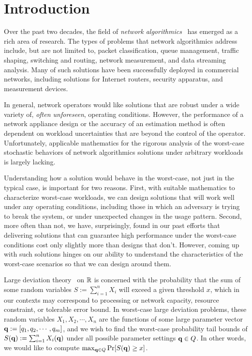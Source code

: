 \section{Introduction}

Over the past two decades, the field of \emph{network algorithmics}~\cite{Varghese04Algorithmics}
has emerged as a rich area of research. The types of problems that network
algorithmics address include, but are not limited to, packet classification,
queue management, traffic shaping, switching and routing, network measurement,
and data streaming analysis. Many of such solutions have been successfully
deployed in commercial networks, including solutions for Internet routers,
security apparatus, and measurement devices. 

In general, network operators
would like solutions that are robust under a wide variety of, \emph{often
unforeseen}, operating conditions. However, the performance of a network appliance
design or the accuracy of an estimation method is often dependent on workload
uncertainties that are beyond the control of the operator. Unfortunately,
applicable mathematics for the rigorous analysis of the worst-case stochastic behaviors of
network algorithmics solutions under arbitrary workloads is largely lacking.

Understanding how a solution would behave in the worst-case, not just in
the typical case, is important for two reasons. First, with suitable mathematics
to characterize worst-case workloads, we can design solutions that will work
well under any operating conditions, including those in which an adversary is
trying to break the system, or under unexpected changes in the usage pattern.
Second, more often than not, we have, surprisingly, found in our past efforts
that delivering solutions that can guarantee high performance under the worst-case
conditions cost only slightly more than designs that don't. However, coming up
with such solutions hinges on our ability to understand the characteristics
of the worst-case scenarios so that we can design around them.

Large deviation theory~\cite{Dembo98LDV} on $\mathbb R$ is concerned with the probability that
the sum of some random variables $S := \sum_{i=1}^n X_i$ will exceed a given
threshold $x$, which in our contexts may correspond to processing or network capacity,
resource constraint, or tolerable error bound. In worst-case large deviation problems, 
these random variables $X_1, X_2, \cdots, X_n$
are the functions of some large parameter vector $\mathbf{q} := \lbrack q_1, q_2, \cdots, q_m\rbrack$,
and we wish to find the worst-case probability tail bounds of
$S(\mathbf{q}) := \sum_{i=1}^n X_i(\mathbf{q})$ under all possible parameter
settings $\mathbf{q} \in Q$. In other words, we would like to compute
$\max_{\mathbf{q}\in Q} \Pr[S(\mathbf{q}) \ge x]$.

